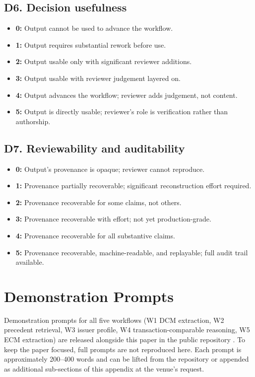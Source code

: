 \documentclass[11pt]{article}
\begin{document}
\subsection*{D6. Decision usefulness}
\begin{itemize}[leftmargin=*,itemsep=0.1em]
\item \textbf{0:} Output cannot be used to advance the workflow.
\item \textbf{1:} Output requires substantial rework before use.
\item \textbf{2:} Output usable only with significant reviewer additions.
\item \textbf{3:} Output usable with reviewer judgement layered on.
\item \textbf{4:} Output advances the workflow; reviewer adds judgement, not content.
\item \textbf{5:} Output is directly usable; reviewer's role is verification rather than authorship.
\end{itemize}

\subsection*{D7. Reviewability and auditability}
\begin{itemize}[leftmargin=*,itemsep=0.1em]
\item \textbf{0:} Output's provenance is opaque; reviewer cannot reproduce.
\item \textbf{1:} Provenance partially recoverable; significant reconstruction effort required.
\item \textbf{2:} Provenance recoverable for some claims, not others.
\item \textbf{3:} Provenance recoverable with effort; not yet production-grade.
\item \textbf{4:} Provenance recoverable for all substantive claims.
\item \textbf{5:} Provenance recoverable, machine-readable, and replayable; full audit trail available.
\end{itemize}

\section{Demonstration Prompts}
\label{app:prompts}

Demonstration prompts for all five workflows (W1 DCM extraction, W2 precedent retrieval, W3 issuer profile, W4 transaction-comparable reasoning, W5 ECM extraction) are released alongside this paper in the public repository \citep{cmlrs2026repo}. To keep the paper focused, full prompts are not reproduced here. Each prompt is approximately 200--400 words and can be lifted from the repository or appended as additional sub-sections of this appendix at the venue's request.
\end{document}
